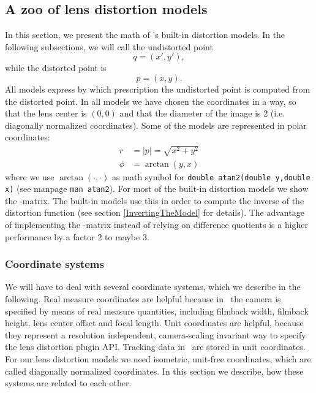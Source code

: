 \documentclass[10pt,a4paper]{article}
\newcommand{\norm}[1]{\left|#1\right|}
\begin{document}
\subsection{A zoo of lens distortion models}
In this section, we present the math of \tde's built-in distortion models.
In the following subsections, we will call the undistorted point
\begin{equation}
q = (x',y'),
\end{equation}
while the distorted point is
\begin{equation}
p = (x,y).
\end{equation}
All models express by which prescription the undistorted
point is computed from the distorted point. In all models we have
chosen the coordinates in a way, so that the lens center is $(0,0)$
and that the diameter of the image is 2 (i.e. diagonally normalized coordinates).
Some of the models are represented in polar coordinates:
\begin{align}
r &= \norm{p} = \sqrt{x^2 + y^2}\nonumber\\
\phi &= \arctan(y,x)
\end{align}
where we use $\arctan(\cdot,\cdot)$ as math symbol for {\tt double atan2(double y,double x)}
(see manpage {\tt man atan2}).
For most of the built-in distortion models we show the \Jacobi-matrix.
The built-in models use this in order to compute the inverse of the
distortion function (see section \ref{InvertingTheModel} for details).
The advantage of implementing the \Jacobi-matrix instead of relying on difference quotients
is a higher performance by a factor 2 to maybe 3.

\subsubsection{Coordinate systems}
We will have to deal with several coordinate systems,
which we describe in the following. Real measure coordinates
are helpful because in \tde\ the camera is specified by means
of real measure quantities, including filmback width, filmback height, lens center offset
and focal length. Unit coordinates are helpful, because they represent a resolution independent,
camera-scaling invariant way to specify the lens distortion plugin API.
Tracking data in \tde\ are stored in unit coordinates. For our lens distortion models
we need isometric, unit-free coordinates, which are called diagonally normalized coordinates.
In this section we describe, how these systems are related to each other.
%
\end{document}
